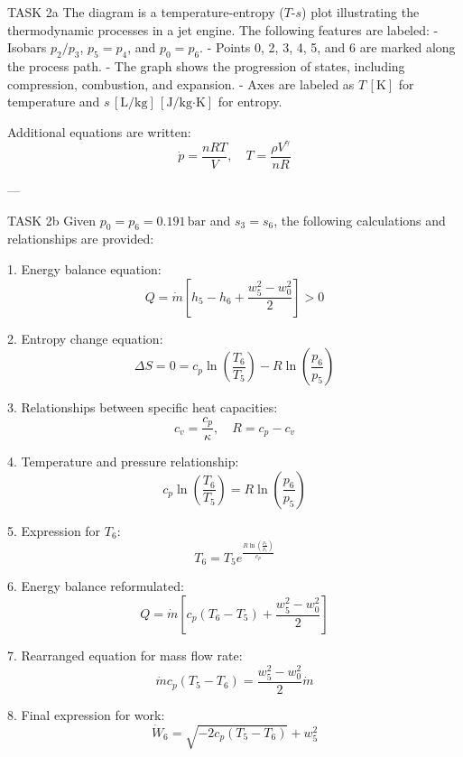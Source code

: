 TASK 2a  
The diagram is a temperature-entropy (\(T\)-\(s\)) plot illustrating the thermodynamic processes in a jet engine. The following features are labeled:  
- Isobars \(p_2/p_3\), \(p_5=p_4\), and \(p_0=p_6\).  
- Points 0, 2, 3, 4, 5, and 6 are marked along the process path.  
- The graph shows the progression of states, including compression, combustion, and expansion.  
- Axes are labeled as \(T \, [\text{K}]\) for temperature and \(s \, [\text{L}/\text{kg}] \, [\text{J}/\text{kg·K}]\) for entropy.  

Additional equations are written:  
\[
\dot{p} = \frac{nRT}{V}, \quad T = \frac{\rho V^{\gamma}}{nR}
\]

---

TASK 2b  
Given \(p_0 = p_6 = 0.191 \, \text{bar}\) and \(s_3 = s_6\), the following calculations and relationships are provided:  

1. Energy balance equation:  
\[
Q = \dot{m} \left[ h_5 - h_6 + \frac{w_5^2 - w_0^2}{2} \right] > 0
\]

2. Entropy change equation:  
\[
\Delta S = 0 = c_p \ln \left( \frac{T_6}{T_5} \right) - R \ln \left( \frac{p_6}{p_5} \right)
\]

3. Relationships between specific heat capacities:  
\[
c_v = \frac{c_p}{\kappa}, \quad R = c_p - c_v
\]

4. Temperature and pressure relationship:  
\[
c_p \ln \left( \frac{T_6}{T_5} \right) = R \ln \left( \frac{p_6}{p_5} \right)
\]

5. Expression for \(T_6\):  
\[
T_6 = T_5 e^{\frac{R \ln \left( \frac{p_6}{p_5} \right)}{c_p}}
\]

6. Energy balance reformulated:  
\[
Q = \dot{m} \left[ c_p (T_6 - T_5) + \frac{w_5^2 - w_0^2}{2} \right]
\]

7. Rearranged equation for mass flow rate:  
\[
\dot{m} c_p (T_5 - T_6) = \frac{w_5^2 - w_0^2}{2} \dot{m}
\]

8. Final expression for work:  
\[
\dot{W}_6 = \sqrt{-2 c_p (T_5 - T_6)} + w_5^2
\]